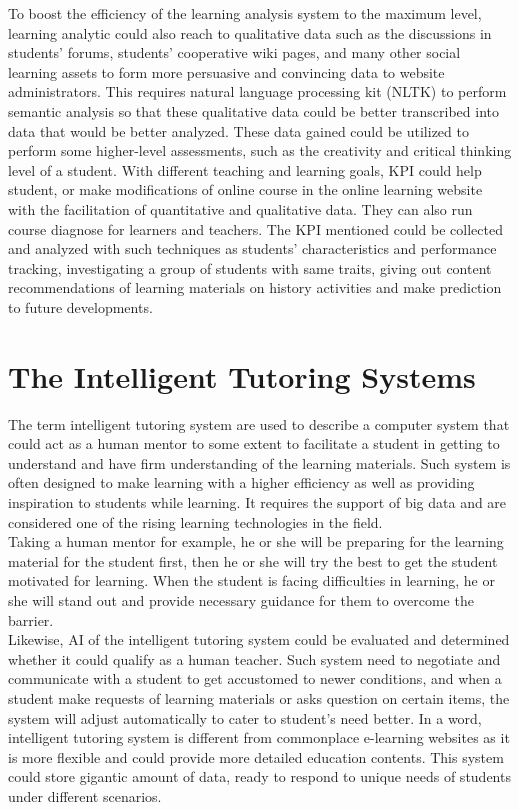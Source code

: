 \documentclass[sigconf]{acmart}
\begin{document}
To boost the efficiency of the learning analysis system to the maximum level, learning analytic could also reach to qualitative data such as the discussions in students' forums, students' cooperative wiki pages, and many other social learning assets to form more persuasive and convincing data to website administrators. This requires natural language processing kit (NLTK) to perform semantic analysis so that these qualitative data could be better transcribed into data that would be better analyzed. These data gained could be utilized to perform some higher-level assessments, such as the creativity and critical thinking level of a student\cite{Dwivedi2013}.
With different teaching and learning goals, KPI could help student, or make modifications of online course in the online learning website with the facilitation of quantitative and qualitative data. They can also run course diagnose for learners and teachers. The KPI mentioned could be collected and analyzed with such techniques as students' characteristics and performance tracking, investigating a group of students with same traits, giving out content recommendations of learning materials on history activities and make prediction to future developments.\\
\section{The Intelligent Tutoring Systems}
The term intelligent tutoring system are used to describe a computer system that could act as a human mentor to some extent to facilitate a student in getting to understand and have firm understanding of the learning materials. Such system is often designed to make learning with a higher efficiency as well as providing inspiration to students while learning. It requires the support of big data and are considered one of the rising learning technologies in the field\cite{Office2013}. \\
Taking a human mentor for example, he or she will be preparing for the learning material for the student first, then he or she will try the best to get the student motivated for learning. When the student is facing difficulties in learning, he or she will stand out and provide necessary guidance for them to overcome the barrier. \\
Likewise, AI of the intelligent tutoring system could be evaluated and determined whether it could qualify as a human teacher. Such system need to negotiate and communicate with a student to get accustomed to newer conditions, and when a student make requests of learning materials or asks question on certain items, the system will adjust automatically to cater to student's need better. In a word, intelligent tutoring system is different from commonplace e-learning websites as it is more flexible and could provide more detailed education contents. This system could store gigantic amount of data, ready to respond to unique needs of students under different scenarios\cite{Jansen2009}.\\
\end{document}
